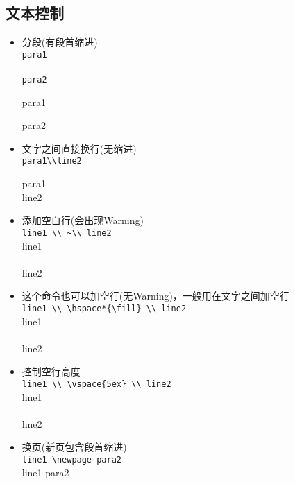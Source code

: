 \subsection{文本控制}

\begin{itemize}
    \item 分段(有段首缩进) \\
    \verb|para1|\\ \hspace*{\fill} \\\verb|para2|

    para1

    para2

    \item 文字之间直接换行(无缩进)\\
    \verb|para1\\line2|

    para1\\line2

    \item 添加空白行(会出现Warning) \\
    \verb|line1 \\ ~\\ line2| \\
    line1 \\ ~\\ line2

    \item 这个命令也可以加空行(无Warning)，一般用在文字之间加空行 \\
    \verb|line1 \\ \hspace*{\fill} \\ line2| \\
    line1\\ \hspace*{\fill} \\line2

    \item 控制空行高度 \\
    \verb|line1 \\ \vspace{5ex} \\ line2| \\
    line1 \\ \vspace{5ex} \\ line2

    \item 换页(新页包含段首缩进) \\
    \verb|line1 \newpage para2| \\
    line1 \newpage para2
\end{itemize}


